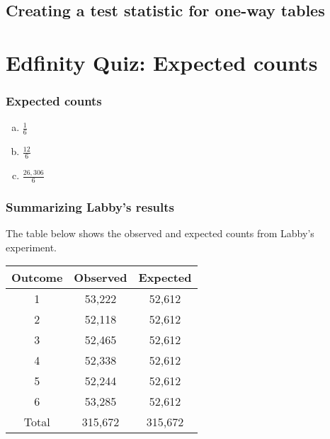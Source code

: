 \documentclass[slidestop,compress,mathserif]{beamer}
\newcommand{\soln}[1]{\textit{#1}}
\begin{document}

\subsection*{Creating a test statistic for one-way tables}


\section{Edfinity Quiz: Expected counts}


\begin{frame}
\frametitle{Expected counts}


\begin{enumerate}[(a)]
\item $\frac{1}{6}$
\item $\frac{12}{6}$
\item $\frac{26,306}{6}$
 \soln{}
\end{enumerate}

\end{frame}


\begin{frame}
\frametitle{Summarizing Labby's results}

The table below shows the observed and expected counts from Labby's experiment.

{\small
\begin{center}
\renewcommand\arraystretch{1.2}
\begin{tabular}{c | c c}
Outcome	& Observed	& Expected \\
\hline
1		& 53,222		& 52,612 \\
2		& 52,118		& 52,612 \\
3		& 52,465		& 52,612 \\
4		& 52,338		& 52,612 \\
5		& 52,244		& 52,612 \\
6		& 53,285		& 52,612 \\
\hline
Total		& 315,672		& 315,672
\end{tabular}
\end{center}
}

\pause
{}

\end{frame}
\end{document}
